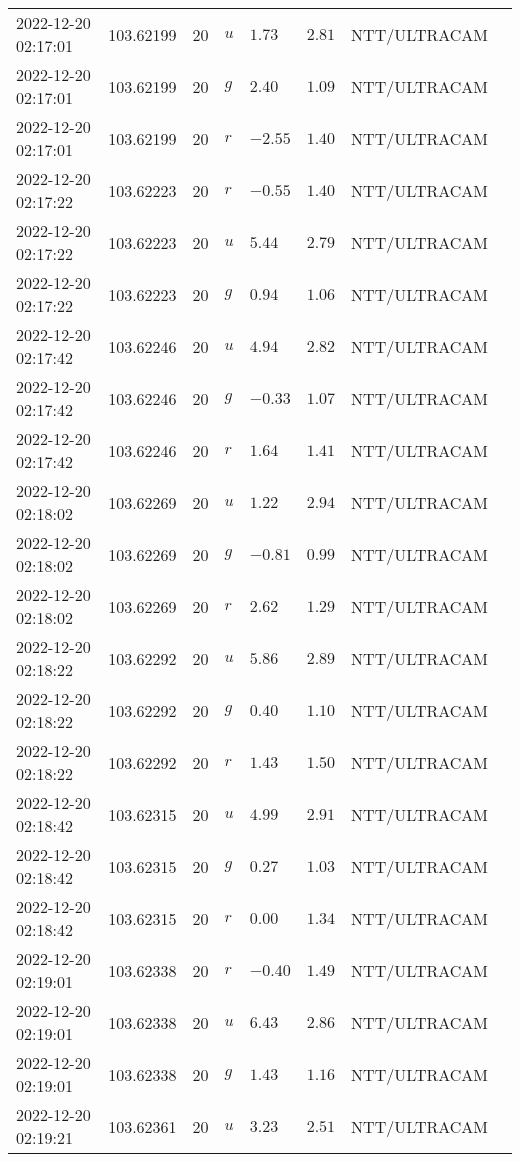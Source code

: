 \documentclass{nature_plusfigure}
\begin{document}
\begin{supplement}
\begin{center}
\begin{longtable}{llllllll}
2022-12-20 02:17:01 & 103.62199 & 20 & $u$ & $1.73$ & $2.81$ & NTT/ULTRACAM &  \\ 
2022-12-20 02:17:01 & 103.62199 & 20 & $g$ & $2.40$ & $1.09$ & NTT/ULTRACAM &  \\ 
2022-12-20 02:17:01 & 103.62199 & 20 & $r$ & $-2.55$ & $1.40$ & NTT/ULTRACAM &  \\ 
2022-12-20 02:17:22 & 103.62223 & 20 & $r$ & $-0.55$ & $1.40$ & NTT/ULTRACAM &  \\ 
2022-12-20 02:17:22 & 103.62223 & 20 & $u$ & $5.44$ & $2.79$ & NTT/ULTRACAM &  \\ 
2022-12-20 02:17:22 & 103.62223 & 20 & $g$ & $0.94$ & $1.06$ & NTT/ULTRACAM &  \\ 
2022-12-20 02:17:42 & 103.62246 & 20 & $u$ & $4.94$ & $2.82$ & NTT/ULTRACAM &  \\ 
2022-12-20 02:17:42 & 103.62246 & 20 & $g$ & $-0.33$ & $1.07$ & NTT/ULTRACAM &  \\ 
2022-12-20 02:17:42 & 103.62246 & 20 & $r$ & $1.64$ & $1.41$ & NTT/ULTRACAM &  \\ 
2022-12-20 02:18:02 & 103.62269 & 20 & $u$ & $1.22$ & $2.94$ & NTT/ULTRACAM &  \\ 
2022-12-20 02:18:02 & 103.62269 & 20 & $g$ & $-0.81$ & $0.99$ & NTT/ULTRACAM &  \\ 
2022-12-20 02:18:02 & 103.62269 & 20 & $r$ & $2.62$ & $1.29$ & NTT/ULTRACAM &  \\ 
2022-12-20 02:18:22 & 103.62292 & 20 & $u$ & $5.86$ & $2.89$ & NTT/ULTRACAM &  \\ 
2022-12-20 02:18:22 & 103.62292 & 20 & $g$ & $0.40$ & $1.10$ & NTT/ULTRACAM &  \\ 
2022-12-20 02:18:22 & 103.62292 & 20 & $r$ & $1.43$ & $1.50$ & NTT/ULTRACAM &  \\ 
2022-12-20 02:18:42 & 103.62315 & 20 & $u$ & $4.99$ & $2.91$ & NTT/ULTRACAM &  \\ 
2022-12-20 02:18:42 & 103.62315 & 20 & $g$ & $0.27$ & $1.03$ & NTT/ULTRACAM &  \\ 
2022-12-20 02:18:42 & 103.62315 & 20 & $r$ & $0.00$ & $1.34$ & NTT/ULTRACAM &  \\ 
2022-12-20 02:19:01 & 103.62338 & 20 & $r$ & $-0.40$ & $1.49$ & NTT/ULTRACAM &  \\ 
2022-12-20 02:19:01 & 103.62338 & 20 & $u$ & $6.43$ & $2.86$ & NTT/ULTRACAM &  \\ 
2022-12-20 02:19:01 & 103.62338 & 20 & $g$ & $1.43$ & $1.16$ & NTT/ULTRACAM &  \\ 
2022-12-20 02:19:21 & 103.62361 & 20 & $u$ & $3.23$ & $2.51$ & NTT/ULTRACAM &  \\ 

\end{longtable}
\end{center}
\end{supplement}
\end{document}
